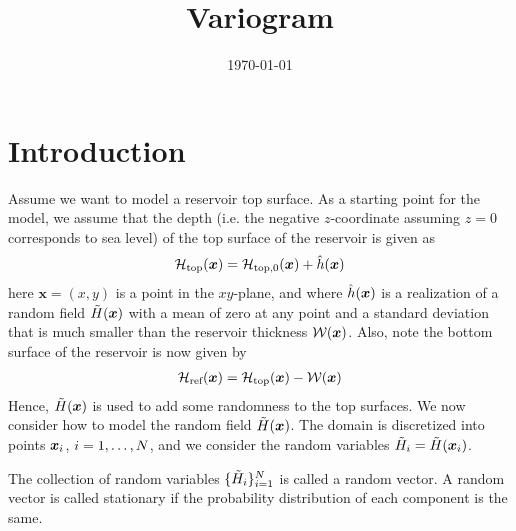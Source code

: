 \documentclass[11pt,a4paper]{amsart}
\begin{document}
\title{Variogram}
\date{\today}
\maketitle
\section{Introduction}
\label{sec:introduction}
Assume we want to model a reservoir top surface. As a starting point for the
model, we assume that the depth (i.e. the negative $z$-coordinate assuming
$z=0$ corresponds to sea level) of the top surface of the reservoir is
given as
\begin{align}
  \label{eq:17}
  \mathcal{H}_{\text{top}}(\boldsymbol{x}) = \mathcal{H}_{\text{top,0}}(\boldsymbol{x})
  + \hat{h}(\boldsymbol{x})
\end{align}
here $\boldsymbol{x} = (x, y)$ is a point in the $xy$-plane, and
where $\hat{h}(\boldsymbol{x})$ is a realization of a random field
$\tilde{H}(\boldsymbol{x})$ with a mean of zero at any point and a
standard deviation that is much smaller than the reservoir thickness
$\mathcal{W}(\boldsymbol{x})$.
Also, note the bottom surface of the reservoir is now given by
\begin{align}
  \label{eq:8}
  \mathcal{H}_{\text{ref}}(\boldsymbol{x}) = \mathcal{H}_{\text{top}}(\boldsymbol{x})
  - \mathcal{W}(\boldsymbol{x})
\end{align}
Hence, $\tilde{H}(\boldsymbol{x})$
is used to add some randomness to the top surfaces.
We now consider how to model the random field $\tilde{H}(\boldsymbol{x})$.
The domain is discretized into points $\boldsymbol{x}_i$, $i=1, \ldots,
N$, and 
we consider the random variables $\tilde{H}_i = \tilde{H}(\boldsymbol{x}_i)$.

The collection of random variables $\{ \tilde{H}_i
\}_{i=1}^{N}$ is called a 
random vector. 
A random vector is called stationary if the probability  
distribution of each component is the same.
\end{document}

